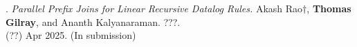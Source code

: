 \paper. \textit{Parallel Prefix Joins for Linear Recursive Datalog Rules.}
Akash Rao$\dagger$, \textbf{Thomas Gilray}, and Ananth Kalyanaraman.
???.
\\(??) Apr 2025. (In submission)
\\ \vspace{-0.1cm}\\
